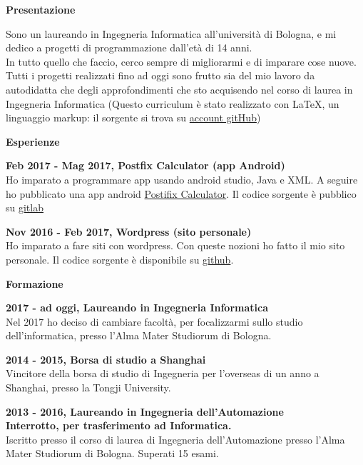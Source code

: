 \documentclass[a4paper,12pt,final]{memoir}
\newcommand{\Sep}{\vspace{1.5em}}
\newcommand{\SmallSep}{\vspace{0.5em}}
\newcommand{\CVSection}[1]
	{\Large\textbf{#1}\par
	\SmallSep\normalsize\normalfont}
\newcommand{\CVItem}[1]
	{\textbf{\color{RoyalBlue} #1}}
\begin{document}
\normalsize\normalfont

\CVSection{Presentazione}
    Sono un laureando in Ingegneria Informatica all'università di Bologna, e mi dedico a progetti di programmazione dall'età di 14 anni.\\
	In tutto quello che faccio, cerco sempre di migliorarmi e di imparare cose nuove.
	Tutti i progetti realizzati fino ad oggi sono frutto sia del mio lavoro da autodidatta che degli approfondimenti che sto acquisendo nel corso di laurea in Ingegneria Informatica
	(Questo curriculum è stato realizzato con \LaTeX, un linguaggio markup:
	il sorgente si trova su \href{https://github.com/Mot93/CV-Mattia-Rubini}{account gitHub})\\
\Sep


\CVSection{Esperienze}
\CVItem{Feb 2017 - Mag 2017, Postfix Calculator (app Android)}\\
	Ho imparato a programmare app usando android studio, Java e XML. 
	A seguire ho pubblicato una app android \href{https://play.google.com/store/apps/details?id=postfixcalculator.mattiarubini.com.postfixcalculator}{ Postifix Calculator}.
	Il codice sorgente è pubblico su \href{https://gitlab.com/mattia.rubini/PostfixCalculator}{gitlab}
\SmallSep

\CVItem{Nov 2016 - Feb 2017, Wordpress (sito personale)}\\
	Ho imparato a fare siti con wordpress. 
	Con queste nozioni ho fatto il mio sito personale. Il codice sorgente è disponibile su \href{https://github.com/Mot93/MattiaRubini-com-wordpress-theme}{github}.
\Sep

\CVSection{Formazione}

\CVItem{2017 - ad oggi, Laureando in Ingegneria Informatica}\\
	Nel 2017 ho deciso di cambiare facoltà, per focalizzarmi sullo studio dell'informatica, presso l'Alma Mater Studiorum di Bologna.
\SmallSep

\CVItem{2014 - 2015, Borsa di studio a Shanghai}\\
	Vincitore della borsa di studio di Ingegneria per l'overseas di un anno a Shanghai, presso la Tongji University.
\SmallSep

\CVItem{2013 - 2016, Laureando in Ingegneria dell'Automazione}\\
	\textbf{Interrotto, per trasferimento ad Informatica.}\\
	Iscritto presso il corso di laurea di Ingegneria dell'Automazione presso l'Alma Mater Studiorum di Bologna.
	Superati 15 esami. 
\SmallSep
\end{document}
